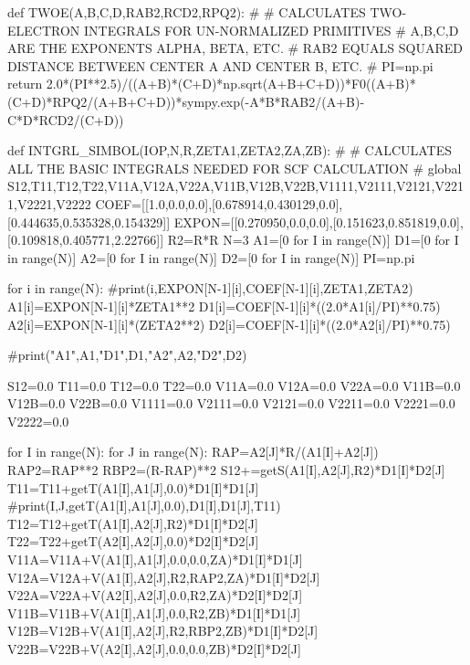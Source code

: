 def TWOE(A,B,C,D,RAB2,RCD2,RPQ2):
#
# CALCULATES TWO-ELECTRON INTEGRALS FOR UN-NORMALIZED PRIMITIVES
# A,B,C,D ARE THE EXPONENTS ALPHA, BETA, ETC.
# RAB2 EQUALS SQUARED DISTANCE BETWEEN CENTER A AND CENTER B, ETC.
#
    PI=np.pi
    return 2.0*(PI**2.5)/((A+B)*(C+D)*np.sqrt(A+B+C+D))*F0((A+B)*(C+D)*RPQ2/(A+B+C+D))*sympy.exp(-A*B*RAB2/(A+B)-C*D*RCD2/(C+D))


def INTGRL_SIMBOL(IOP,N,R,ZETA1,ZETA2,ZA,ZB):
#
#  CALCULATES ALL THE BASIC INTEGRALS NEEDED FOR SCF CALCULATION
#
    global S12,T11,T12,T22,V11A,V12A,V22A,V11B,V12B,V22B,V1111,V2111,V2121,V2211,V2221,V2222
    COEF=[[1.0,0.0,0.0],[0.678914,0.430129,0.0],[0.444635,0.535328,0.154329]]
    EXPON=[[0.270950,0.0,0.0],[0.151623,0.851819,0.0],[0.109818,0.405771,2.22766]]
    R2=R*R
    N=3
    A1=[0 for I in range(N)]
    D1=[0 for I in range(N)]
    A2=[0 for I in range(N)]
    D2=[0 for I in range(N)]
    PI=np.pi

    for i in range(N):
        #print(i,EXPON[N-1][i],COEF[N-1][i],ZETA1,ZETA2)
        A1[i]=EXPON[N-1][i]*ZETA1**2
        D1[i]=COEF[N-1][i]*((2.0*A1[i]/PI)**0.75)
        A2[i]=EXPON[N-1][i]*(ZETA2**2)
        D2[i]=COEF[N-1][i]*((2.0*A2[i]/PI)**0.75)

    #print("A1",A1,"D1",D1,"A2",A2,"D2",D2)
        
    S12=0.0
    T11=0.0
    T12=0.0
    T22=0.0
    V11A=0.0
    V12A=0.0
    V22A=0.0
    V11B=0.0
    V12B=0.0
    V22B=0.0
    V1111=0.0
    V2111=0.0
    V2121=0.0
    V2211=0.0
    V2221=0.0
    V2222=0.0
    
    for I in range(N):
        for J in range(N):
            RAP=A2[J]*R/(A1[I]+A2[J])
            RAP2=RAP**2
            RBP2=(R-RAP)**2
            S12+=getS(A1[I],A2[J],R2)*D1[I]*D2[J]
            T11=T11+getT(A1[I],A1[J],0.0)*D1[I]*D1[J]
            #print(I,J,getT(A1[I],A1[J],0.0),D1[I],D1[J],T11)
            T12=T12+getT(A1[I],A2[J],R2)*D1[I]*D2[J]
            T22=T22+getT(A2[I],A2[J],0.0)*D2[I]*D2[J]
            V11A=V11A+V(A1[I],A1[J],0.0,0.0,ZA)*D1[I]*D1[J]
            V12A=V12A+V(A1[I],A2[J],R2,RAP2,ZA)*D1[I]*D2[J]
            V22A=V22A+V(A2[I],A2[J],0.0,R2,ZA)*D2[I]*D2[J]
            V11B=V11B+V(A1[I],A1[J],0.0,R2,ZB)*D1[I]*D1[J]
            V12B=V12B+V(A1[I],A2[J],R2,RBP2,ZB)*D1[I]*D2[J]
            V22B=V22B+V(A2[I],A2[J],0.0,0.0,ZB)*D2[I]*D2[J]
        
